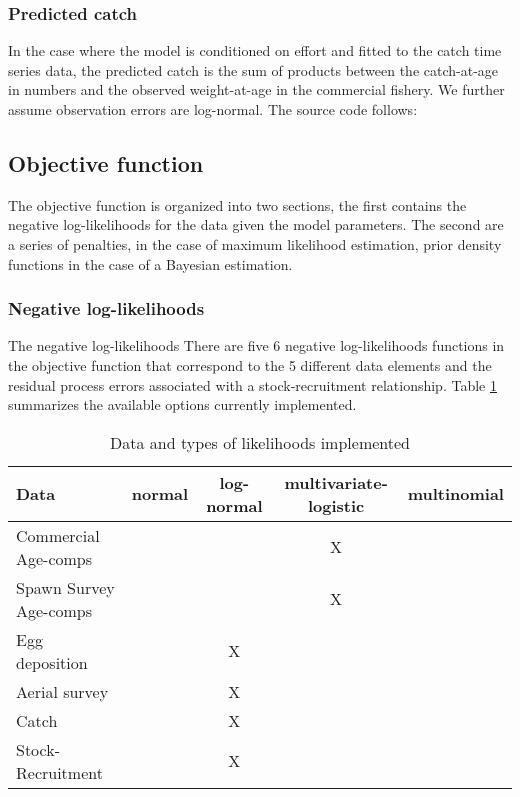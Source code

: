 \documentclass[12pt,letterpaper]{article}
\begin{document}
    \subsubsection{Predicted catch} %
    \label{ssub:predicted_catch}
    In the case where the model is conditioned on effort and fitted to the catch time series data, the predicted catch is the sum of products between the catch-at-age in numbers and the observed weight-at-age in the commercial fishery.
    We further assume observation errors are log-normal. The source code follows:
    

  \subsection{Objective function} %
  \label{sub:objective_function}
  The objective function is organized into two sections, the first contains the negative log-likelihoods for the data given the model parameters.  The second are a series of penalties, in the case of maximum likelihood estimation, prior density functions in the case of a Bayesian estimation.
    \subsubsection{Negative log-likelihoods} %
    \label{ssub:negative_loglikelihoods}
    The negative log-likelihoods 
    There are five 6 negative log-likelihoods functions in the objective function that correspond to the 5 different data elements and the residual process errors associated with a stock-recruitment relationship. Table \ref{tab:likelihoodOptions} summarizes the available options currently implemented.

    \begin{table}[h]
      \caption{Data and types of likelihoods implemented}
      \label{tab:likelihoodOptions}
      \begin{tabular}{l|c|c|c|c}
        \hline
        Data & normal & log-normal & multivariate-logistic & multinomial\\
        \hline
        Commercial Age-comps & & & X\\
        Spawn Survey Age-comps & & & X\\
        Egg deposition & & X & \\
        Aerial survey & & X  & \\
        Catch  & & X & \\
        Stock-Recruitment & & X & \\
      \end{tabular}
    \end{table}
\end{document}
